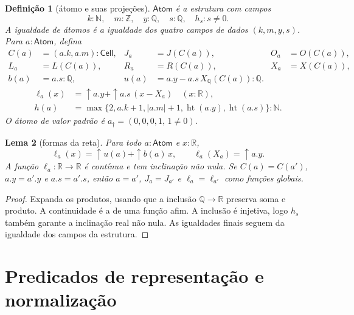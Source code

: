 \documentclass[11pt,a4paper]{article}
\newtheorem{definicao}{Definição}[section]
\newtheorem{lema}[definicao]{Lema}
\newcommand{\N}{\mathbb N}
\newcommand{\Z}{\mathbb Z}
\newcommand{\Q}{\mathbb Q}
\newcommand{\R}{\mathbb R}
\newcommand{\Atoms}{\mathsf{Atom}}
\newcommand{\Cell}{\mathsf{Cell}}
\newcommand{\htq}{\operatorname{ht}}
\begin{document}
\begin{definicao}[átomo e suas projeções]\label{def:atom}
$\Atoms$ é a estrutura com campos
\[
 k:\N,\quad m:\Z,\quad y:\Q,\quad s:\Q,\quad h_s:s\ne0.
\]
A igualdade de átomos é a igualdade dos quatro campos de dados
$(k,m,y,s)$. Para $a:\Atoms$, defina
\begin{align*}
 C(a)&=(a.k,a.m):\Cell, & J_a&=J(C(a)), & O_a&=O(C(a)),\\
 L_a&=L(C(a)),&R_a&=R(C(a)),&X_a&=X(C(a)),\\
 b(a)&=a.s:\Q,& u(a)&=a.y-a.s\,X_\Q(C(a)):\Q.
\end{align*}
\begin{align*}
 \ell_a(x)&=\uparrow a.y+\uparrow a.s\,(x-X_a)\quad(x:\R),\\
 h(a)&=\max\{2,a.k+1,|a.m|+1,\htq(a.y),\htq(a.s)\}:\N.
\end{align*}
O átomo de valor padrão é
$a_\dagger=(0,0,0,1,\,1\ne0)$.
\end{definicao}

\begin{lema}[formas da reta]\label{lem:line}
Para todo $a:\Atoms$ e $x:\R$,
\[
 \ell_a(x)=\uparrow u(a)+\uparrow b(a)\,x,\qquad
 \ell_a(X_a)=\uparrow a.y.
\]
A função $\ell_a:\R\to\R$ é contínua e tem inclinação não nula.
Se $C(a)=C(a')$, $a.y=a'.y$ e $a.s=a'.s$, então
$a=a'$, $J_a=J_{a'}$ e $\ell_a=\ell_{a'}$ como funções globais.
\end{lema}
\begin{proof}
Expanda os produtos, usando que a inclusão $\Q\to\R$ preserva soma
e produto. A continuidade é a de uma função afim. A inclusão é
injetiva, logo $h_s$ também garante a inclinação real não nula.
As igualdades finais seguem da igualdade dos campos da estrutura.
\end{proof}

\section{Predicados de representação e normalização}
\label{sec:normalization}
\end{document}
